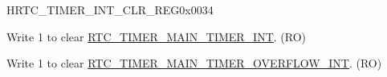 \begin{register}{H}{RTC\_TIMER\_INT\_CLR\_REG}{0x0034}\label{regdesc:RTCTIMERINTCLRREG}
%
%
%
\regnewline%
\begin{regdesc}\begin{reglist}
\label{fielddesc:RTCTIMERMAINTIMERINTCLR}\item [RTC\_TIMER\_MAIN\_TIMER\_INT\_CLR] Write 1 to clear \hyperref[int:RTCTIMERMAINTIMERINT]{RTC\_TIMER\_MAIN\_TIMER\_INT}. (RO)
\label{fielddesc:RTCTIMERMAINTIMEROVERFLOWINTCLR}\item [RTC\_TIMER\_MAIN\_TIMER\_OVERFLOW\_INT\_CLR] Write 1 to clear \hyperref[int:RTCTIMERMAINTIMEROVERFLOWINT]{RTC\_TIMER\_MAIN\_TIMER\_OVERFLOW\_INT}. (RO)
\end{reglist}\end{regdesc}
\end{register}